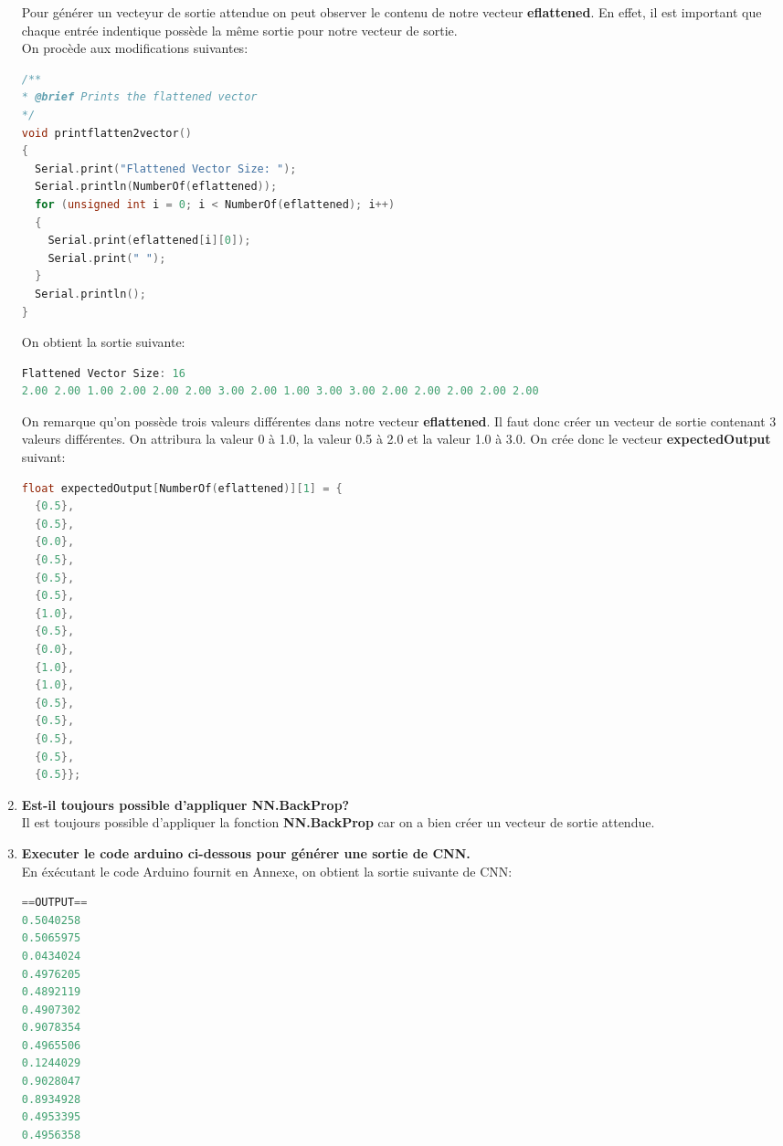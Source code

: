 \begin{enumerate}
{    Pour générer un vecteyur de sortie attendue on peut observer le contenu de notre vecteur \textbf{eflattened}. 
    En effet, il est important que chaque entrée indentique possède la même sortie pour notre vecteur de sortie. \\
    On procède aux modifications suivantes:
    \begin{lstlisting}[language=C]
/**
* @brief Prints the flattened vector
*/
void printflatten2vector()
{
  Serial.print("Flattened Vector Size: ");
  Serial.println(NumberOf(eflattened));
  for (unsigned int i = 0; i < NumberOf(eflattened); i++)
  {
    Serial.print(eflattened[i][0]);
    Serial.print(" ");
  }
  Serial.println();
}    
    \end{lstlisting}
    On obtient la sortie suivante:
    \begin{lstlisting}[language=C]
Flattened Vector Size: 16
2.00 2.00 1.00 2.00 2.00 2.00 3.00 2.00 1.00 3.00 3.00 2.00 2.00 2.00 2.00 2.00
    \end{lstlisting}
    On remarque qu'on possède trois valeurs différentes dans notre vecteur \textbf{eflattened}.
    Il faut donc créer un vecteur de sortie contenant 3 valeurs différentes. On attribura la valeur 0 à 1.0, la valeur 0.5 à 2.0 et la valeur 1.0 à 3.0.
    On crée donc le vecteur \textbf{expectedOutput} suivant:
    \begin{lstlisting}[language=C]
float expectedOutput[NumberOf(eflattened)][1] = {
  {0.5},
  {0.5},
  {0.0},
  {0.5},
  {0.5},
  {0.5},
  {1.0},
  {0.5},
  {0.0},
  {1.0},
  {1.0},
  {0.5},
  {0.5},
  {0.5},
  {0.5},
  {0.5}};
    \end{lstlisting}
  } 
  \item {
    \textbf{Est-il toujours possible d'appliquer NN.BackProp?} \vspace{0.2cm} \\
    Il est toujours possible d'appliquer la fonction \textbf{NN.BackProp} car on a bien créer un vecteur de sortie attendue.
  } \\
  \item {
    \textbf{Executer le code arduino ci-dessous pour générer une sortie de CNN.} \vspace{0.2cm} \\ 
    En éxécutant le code Arduino fournit en Annexe, on obtient la sortie suivante de CNN:
    \begin{lstlisting}[language=C]
==OUTPUT==
0.5040258
0.5065975
0.0434024
0.4976205
0.4892119
0.4907302
0.9078354
0.4965506
0.1244029
0.9028047
0.8934928
0.4953395
0.4956358

\end{lstlisting}}
\end{enumerate}
